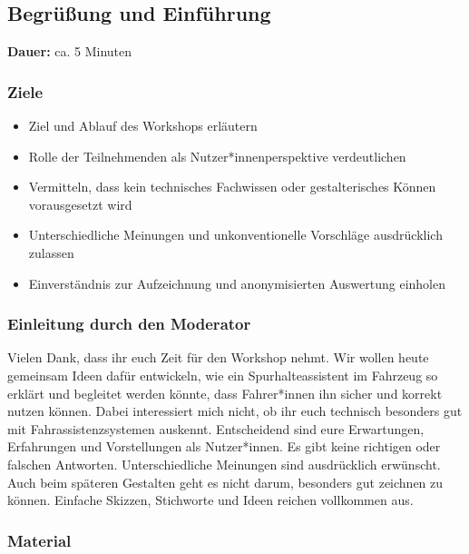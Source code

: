 \clearpage

\subsection{Begrüßung und Einführung}
\label{subsec:workshop-begruessung}

\noindent
\textbf{Dauer:} ca. 5 Minuten

\subsubsection*{Ziele}

\begin{itemize}
    \item Ziel und Ablauf des Workshops erläutern
    \item Rolle der Teilnehmenden als Nutzer*innenperspektive
    verdeutlichen
    \item Vermitteln, dass kein technisches Fachwissen oder
    gestalterisches Können vorausgesetzt wird
    \item Unterschiedliche Meinungen und unkonventionelle Vorschläge
    ausdrücklich zulassen
    \item Einverständnis zur Aufzeichnung und anonymisierten Auswertung
    einholen
\end{itemize}

\subsubsection*{Einleitung durch den Moderator}

Vielen Dank, dass ihr euch Zeit für den Workshop nehmt. Wir wollen heute gemeinsam Ideen dafür entwickeln, wie ein Spurhalteassistent im Fahrzeug so erklärt und begleitet werden könnte, dass Fahrer*innen ihn sicher und korrekt nutzen können. Dabei interessiert mich nicht, ob ihr euch technisch besonders gut mit Fahrassistenzsystemen auskennt. Entscheidend sind eure Erwartungen, Erfahrungen und Vorstellungen als Nutzer*innen. Es gibt keine richtigen oder falschen Antworten. Unterschiedliche Meinungen sind ausdrücklich erwünscht. Auch beim späteren Gestalten geht es nicht darum, besonders gut zeichnen zu können. Einfache Skizzen, Stichworte und Ideen reichen vollkommen aus.

\subsubsection*{Material}


